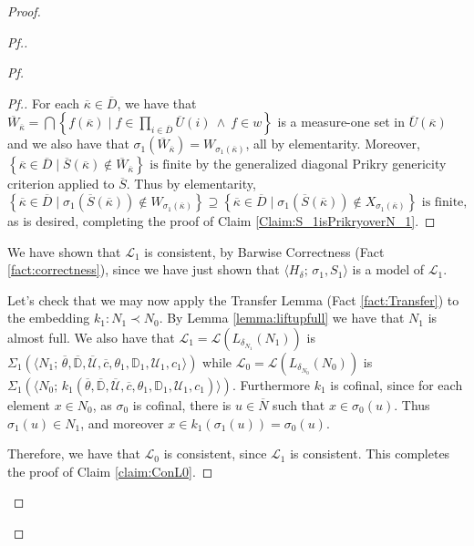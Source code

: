 \documentclass{amsart}
\theoremstyle{definition}
\theoremstyle{remark}
\newcommand{\D}{\mathbb{D}}
\newcommand{\N}{{\overline{N}}}
\renewcommand{\S}{{\overline{S}}}
\newcommand{\U}{\mathcal{U}}
\newcommand{\st}{\; | \;}
\newcommand{\set}[2]{\left\{#1\st #2 \right\}}
\begin{document}
\begin{proof}
\begin{proof}[Pf.]
\begin{proof}[Pf]
\begin{proof}[Pf.]
For each $\overline \kappa \in \overline D$, we have that $\overline W_{\overline \kappa} = \bigcap \set{f(\overline \kappa) }{ f \in \prod_{i \in \overline D} \overline U(i) \ \land \ f \in w }$ is a measure-one set in $\overline U(\overline \kappa)$ and we also have that $\sigma_1(\overline W_{\overline \kappa}) = W_{\sigma_1(\overline \kappa)}$, all by elementarity. Moreover, 
$\set{\overline \kappa \in \overline D}{\overline S(\overline \kappa) \notin \overline W_{\overline \kappa}} \text{ is finite}$ by the generalized diagonal Prikry genericity criterion applied to $\overline S$.
Thus by elementarity,
$$\set{ \overline \kappa \in \overline D }{ \sigma_1(\S(\overline \kappa)) \notin W_{\sigma_1(\overline \kappa)} } \supseteq \set{ \overline \kappa \in \overline D }{ \sigma_1(\S(\overline \kappa)) \notin X_{\sigma_1(\overline \kappa)}} \text{ is finite,}$$
as is desired, completing the proof of Claim \ref{Claim:S_1isPrikryoverN_1}.
\end{proof}

We have shown that $\mathcal L_1$ is consistent, by Barwise Correctness (Fact \ref{fact:correctness}), since we have just shown that $\langle H_{\delta}; \, \sigma_1, S_1 \rangle$ is a model of $\mathcal L_1$.

Let's check that we may now apply the Transfer Lemma (Fact \ref{fact:Transfer}) to the embedding $k_1:N_1 \prec N_0$. By Lemma \ref{lemma:liftupfull} we have that $N_1$ is almost full. We also have that $\mathcal L_1 = \mathcal L(L_{\delta_{N_1}}(N_1))$ is 
	$\text{$\Sigma_1(\langle N_1; \, \overline \theta, \overline{\D}, \overline{\U}, \overline c, \theta_1, \D_1, \U_1, c_1 \rangle)$}$ while $\mathcal L_0=\mathcal L(L_{\delta_{N_0}}(N_0))$ is 
	$\text{$\Sigma_1(\langle N_0;\,k_1(\overline \theta, \overline{\D}, \overline{\U}, \overline c, \theta_1, \D_1, \U_1, c_1)\rangle)$.}$
Furthermore $k_1$ is cofinal, since for each element $x \in N_0$, as $\sigma_0$ is cofinal, there is $u \in \N$ such that $x \in \sigma_0(u)$. Thus $\sigma_1(u) \in N_1$, and moreover $x \in k_1(\sigma_1(u))=\sigma_0(u)$. 

Therefore, we have that $\mathcal L_0$ is consistent, since $\mathcal L_1$ is consistent. This completes the proof of Claim \ref{claim:ConL0}. \end{proof}


\end{proof}
\end{proof}
\end{document}
